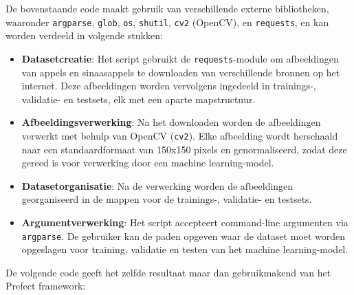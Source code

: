 De bovenstaande code maakt gebruik van verschillende externe bibliotheken, waaronder \texttt{argparse}, \texttt{glob}, \texttt{os}, \texttt{shutil}, \texttt{cv2} (OpenCV), en \texttt{requests}, en kan worden verdeeld in volgende stukken:

\begin{itemize}
    \item \textbf{Datasetcreatie}: Het script gebruikt de \texttt{requests}-module om afbeeldingen van appels en sinaasappels te downloaden van verschillende bronnen op het internet. Deze afbeeldingen worden vervolgens ingedeeld in trainings-, validatie- en testsets, elk met een aparte mapstructuur.
    
    \item \textbf{Afbeeldingsverwerking}: Na het downloaden worden de afbeeldingen verwerkt met behulp van OpenCV (\texttt{cv2}). Elke afbeelding wordt herschaald naar een standaardformaat van 150x150 pixels en genormaliseerd, zodat deze gereed is voor verwerking door een machine learning-model.
    
    \item \textbf{Datasetorganisatie}: Na de verwerking worden de afbeeldingen georganiseerd in de mappen voor de trainings-, validatie- en testsets.
    
    \item \textbf{Argumentverwerking}: Het script accepteert command-line argumenten via \texttt{argparse}. De gebruiker kan de paden opgeven waar de dataset moet worden opgeslagen voor training, validatie en testen van het machine learning-model.
\end{itemize}

De volgende code geeft het zelfde resultaat maar dan gebruikmakend van het Prefect framework:

